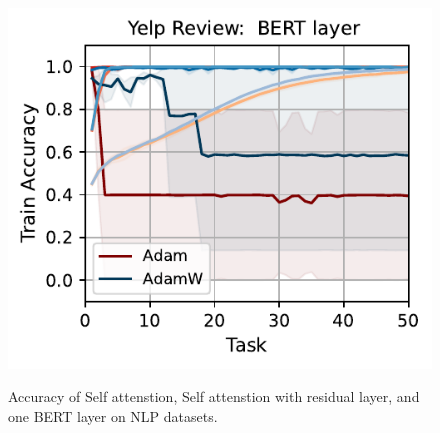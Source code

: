 \begin{figure}[t]
{        \includegraphics[width=\textwidth]{figs/Accuracy/nlp/bert_layer/yelp_review_full_40.pdf}
    }

    \caption{Accuracy of Self attenstion, Self attenstion with residual layer, and one BERT layer on NLP datasets.}
    \label{fig:nlp_self_res}
\end{figure}




